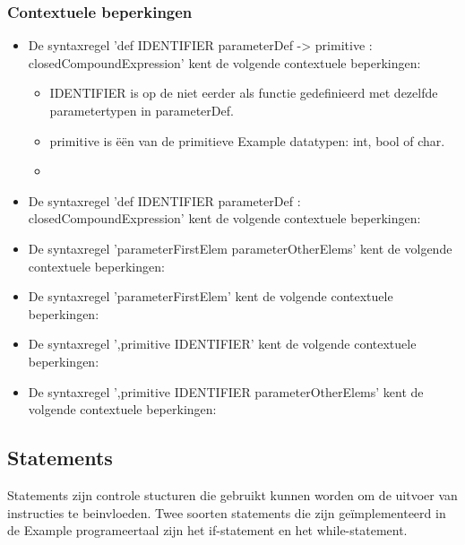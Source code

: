     \subsubsection{Contextuele beperkingen}
        \begin{itemize}
        \item De syntaxregel 'def IDENTIFIER parameterDef -> primitive $\colon$ closedCompoundExpression' kent de volgende contextuele beperkingen:
            \begin{itemize}
                \item IDENTIFIER is op de niet eerder als functie gedefinieerd met dezelfde parametertypen in parameterDef.
                \item primitive is \"{e}\"{e}n van de primitieve Example datatypen: int, bool of char.
                \item 
            \end{itemize}
        \item De syntaxregel 'def IDENTIFIER parameterDef $\colon$ closedCompoundExpression' kent de volgende contextuele beperkingen:
            \begin{itemize}
            \end{itemize}
        \item De syntaxregel 'parameterFirstElem parameterOtherElems' kent de volgende contextuele beperkingen:
            \begin{itemize}
            \end{itemize}        
        \item De syntaxregel 'parameterFirstElem' kent de volgende contextuele beperkingen:
            \begin{itemize}
            \end{itemize}        
        \item De syntaxregel ',primitive IDENTIFIER' kent de volgende contextuele beperkingen:
            \begin{itemize}
            \end{itemize}  
        \item De syntaxregel ',primitive IDENTIFIER parameterOtherElems' kent de volgende contextuele beperkingen:        
            \begin{itemize}
            \end{itemize}  
        \end{itemize}

\subsection{Statements}
Statements zijn controle stucturen die gebruikt kunnen worden om de uitvoer van instructies te beinvloeden. Twee soorten statements die zijn ge\"{i}mplementeerd in de Example programeertaal zijn het if-statement en het while-statement.
